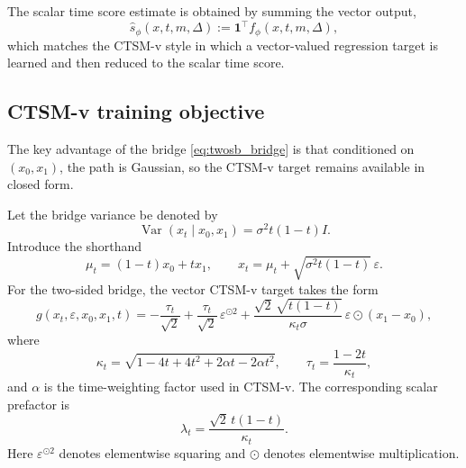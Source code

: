 The scalar time score estimate is obtained by summing the vector output,
\begin{equation}
    \hat s_\phi(x,t,m,\Delta)
    :=
    \mathbf{1}^\top f_\phi(x,t,m,\Delta),
    \label{eq:scalar_from_vector}
\end{equation}
which matches the CTSM-v style in which a vector-valued regression target is learned and then reduced to the scalar time score.

\subsection{CTSM-v training objective}

The key advantage of the bridge \eqref{eq:twosb_bridge} is that conditioned on $(x_0,x_1)$, the path is Gaussian, so the CTSM-v target remains available in closed form.

Let the bridge variance be denoted by
\begin{equation}
    \operatorname{Var}(x_t \mid x_0,x_1)
    =
    \sigma^2 t(1-t) I.
\end{equation}
Introduce the shorthand
\begin{equation}
    \mu_t = (1-t)x_0 + t x_1,
    \qquad
    x_t = \mu_t + \sqrt{\sigma^2 t(1-t)}\,\varepsilon.
\end{equation}
For the two-sided bridge, the vector CTSM-v target takes the form
\begin{equation}
    g(x_t,\varepsilon,x_0,x_1,t)
    =
    -\frac{\tau_t}{\sqrt{2}}
    +
    \frac{\tau_t}{\sqrt{2}}\,\varepsilon^{\odot 2}
    +
    \frac{\sqrt{2}\,\sqrt{t(1-t)}}{\kappa_t \sigma}
    \, \varepsilon \odot (x_1-x_0),
    \label{eq:vector_target}
\end{equation}
where
\begin{equation}
    \kappa_t
    =
    \sqrt{1 - 4t + 4t^2 + 2\alpha t - 2\alpha t^2},
    \qquad
    \tau_t = \frac{1-2t}{\kappa_t},
    \label{eq:kappa_tau}
\end{equation}
and $\alpha$ is the time-weighting factor used in CTSM-v. The corresponding scalar prefactor is
\begin{equation}
    \lambda_t
    =
    \frac{\sqrt{2}\, t(1-t)}{\kappa_t}.
    \label{eq:lambda_t}
\end{equation}
Here $\varepsilon^{\odot 2}$ denotes elementwise squaring and $\odot$ denotes elementwise multiplication.


